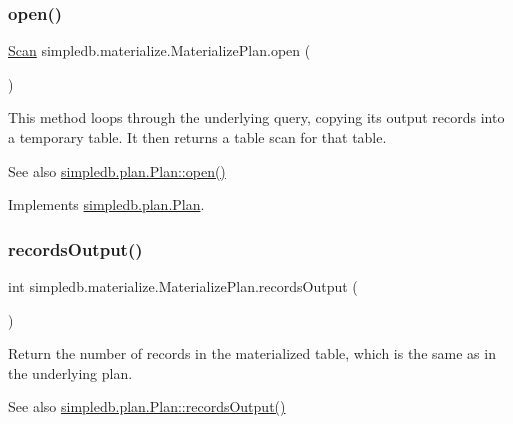 \subsubsection{\texorpdfstring{open()}{open()}}
{\footnotesize\ttfamily \hyperlink{interfacesimpledb_1_1query_1_1Scan}{Scan} simpledb.\+materialize.\+Materialize\+Plan.\+open (\begin{DoxyParamCaption}{ }\end{DoxyParamCaption})\hspace{0.3cm}{\ttfamily [inline]}}

This method loops through the underlying query, copying its output records into a temporary table. It then returns a table scan for that table. \begin{DoxySeeAlso}{See also}
\hyperlink{interfacesimpledb_1_1plan_1_1Plan_aaa4c15cda4e9c0d52308850f9f13ff99}{simpledb.\+plan.\+Plan\+::open()} 
\end{DoxySeeAlso}


Implements \hyperlink{interfacesimpledb_1_1plan_1_1Plan_aaa4c15cda4e9c0d52308850f9f13ff99}{simpledb.\+plan.\+Plan}.

\mbox{\label{classsimpledb_1_1materialize_1_1MaterializePlan_a3e3d3cdd3bff924c476e7943d7fe70e7}} 
\subsubsection{\texorpdfstring{records\+Output()}{recordsOutput()}}
{\footnotesize\ttfamily int simpledb.\+materialize.\+Materialize\+Plan.\+records\+Output (\begin{DoxyParamCaption}{ }\end{DoxyParamCaption})\hspace{0.3cm}{\ttfamily [inline]}}

Return the number of records in the materialized table, which is the same as in the underlying plan. \begin{DoxySeeAlso}{See also}
\hyperlink{interfacesimpledb_1_1plan_1_1Plan_a187e06657d356c80a7f743d7ff8fd257}{simpledb.\+plan.\+Plan\+::records\+Output()} 
\end{DoxySeeAlso}


